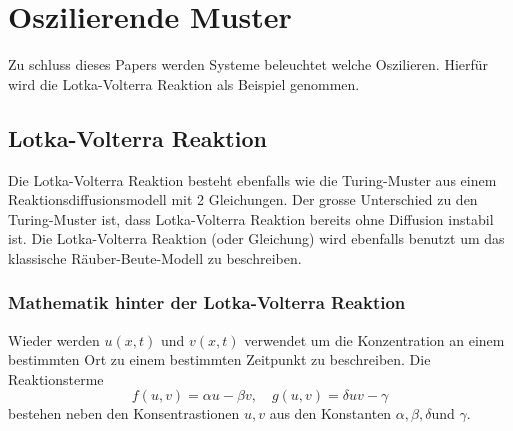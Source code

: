 %
%
%
%
\section{Oszilierende Muster
\label{reaktdiff:section:teil2}}
Zu schluss dieses Papers werden Systeme beleuchtet welche Oszilieren.
Hierfür wird die Lotka-Volterra Reaktion als Beispiel genommen.


\subsection{Lotka-Volterra Reaktion 
\label{reaktdiff:subsection:bonorum}}

Die Lotka-Volterra\cite{Wikipedia_LotkaVolterra_2025} Reaktion besteht ebenfalls wie die Turing-Muster aus einem Reaktionsdiffusionsmodell mit 2 Gleichungen.
Der grosse Unterschied zu den Turing-Muster ist, dass Lotka-Volterra Reaktion bereits ohne Diffusion instabil ist.
Die Lotka-Volterra Reaktion (oder Gleichung) wird ebenfalls benutzt um das klassische Räuber-Beute-Modell zu beschreiben.

\subsubsection{Mathematik hinter der Lotka-Volterra Reaktion}

Wieder werden \(u(x,t)\) und \(v(x,t)\) verwendet um die Konzentration an einem bestimmten Ort zu einem bestimmten Zeitpunkt zu beschreiben.
Die Reaktionsterme
\begin{equation}
     f(u,v) = \alpha u -  \beta v, \quad g(u,v)= \delta uv - \gamma
\end{equation}
bestehen neben den Konsentrastionen \(u,v\) aus den Konstanten \(\alpha,\beta,\delta \)und \(\gamma\).

